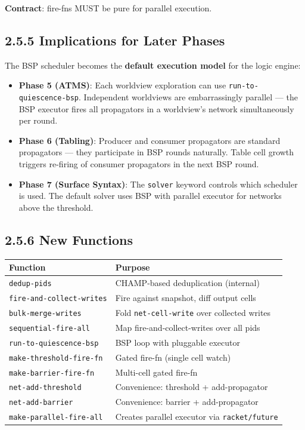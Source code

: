\documentclass[11pt]{article}
\begin{document}
\textbf{Contract}: fire-fns MUST be pure for parallel execution.
\subsection{2.5.5 Implications for Later Phases}
\label{sec:org28c5d66}

The BSP scheduler becomes the \textbf{default execution model} for the logic engine:

\begin{itemize}
\item \textbf{Phase 5 (ATMS)}: Each worldview exploration can use \texttt{run-to-quiescence-bsp}.
Independent worldviews are embarrassingly parallel — the BSP executor fires
all propagators in a worldview's network simultaneously per round.
\item \textbf{Phase 6 (Tabling)}: Producer and consumer propagators are standard
propagators — they participate in BSP rounds naturally. Table cell growth
triggers re-firing of consumer propagators in the next BSP round.
\item \textbf{Phase 7 (Surface Syntax)}: The \texttt{solver} keyword controls which scheduler
is used. The default solver uses BSP with parallel executor for networks
above the threshold.
\end{itemize}
\subsection{2.5.6 New Functions}
\label{sec:orga970c01}

\begin{center}
\begin{tabular}{ll}
Function & Purpose\\
\hline
\texttt{dedup-pids} & CHAMP-based deduplication (internal)\\
\texttt{fire-and-collect-writes} & Fire against snapshot, diff output cells\\
\texttt{bulk-merge-writes} & Fold \texttt{net-cell-write} over collected writes\\
\texttt{sequential-fire-all} & Map fire-and-collect-writes over all pids\\
\texttt{run-to-quiescence-bsp} & BSP loop with pluggable executor\\
\texttt{make-threshold-fire-fn} & Gated fire-fn (single cell watch)\\
\texttt{make-barrier-fire-fn} & Multi-cell gated fire-fn\\
\texttt{net-add-threshold} & Convenience: threshold + add-propagator\\
\texttt{net-add-barrier} & Convenience: barrier + add-propagator\\
\texttt{make-parallel-fire-all} & Creates parallel executor via \texttt{racket/future}\\
\end{tabular}
\end{center}
\end{document}
